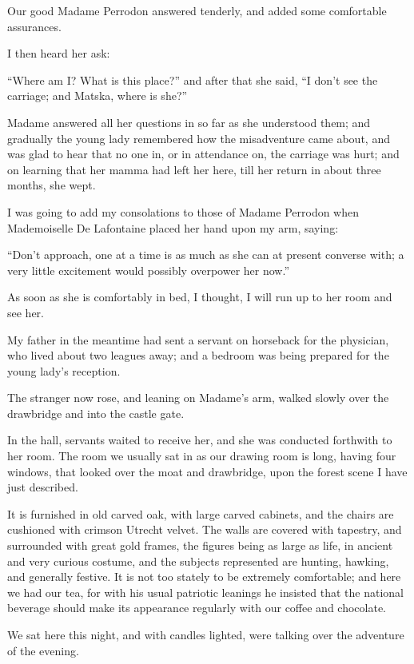 \documentclass[11pt,twoside,makeidx,hidelinks,]{memoir}
\begin{document}
Our good Madame Perrodon answered tenderly, and added some comfortable
assurances.

I then heard her ask:

``Where am I? What is this place?'' and after that she said, ``I don't see
the carriage; and Matska, where is she?''

Madame answered all her questions in so far as she understood them; and
gradually the young lady remembered how the misadventure came about, and
was glad to hear that no one in, or in attendance on, the carriage was
hurt; and on learning that her mamma had left her here, till her return
in about three months, she wept.

I was going to add my consolations to those of Madame Perrodon when
Mademoiselle De Lafontaine placed her hand upon my arm, saying:

``Don't approach, one at a time is as much as she can at present converse
with; a very little excitement would possibly overpower her now.''

As soon as she is comfortably in bed, I thought, I will run up to her
room and see her.

My father in the meantime had sent a servant on horseback for the
physician, who lived about two leagues away; and a bedroom was being
prepared for the young lady's reception.

The stranger now rose, and leaning on Madame's arm, walked slowly over
the drawbridge and into the castle gate.

In the hall, servants waited to receive her, and she was conducted
forthwith to her room. The room we usually sat in as our drawing room is
long, having four windows, that looked over the moat and drawbridge,
upon the forest scene I have just described.

It is furnished in old carved oak, with large carved cabinets, and the
chairs are cushioned with crimson Utrecht velvet. The walls are covered
with tapestry, and surrounded with great gold frames, the figures being
as large as life, in ancient and very curious costume, and the subjects
represented are hunting, hawking, and generally festive. It is not too
stately to be extremely comfortable; and here we had our tea, for with
his usual patriotic leanings he insisted that the national beverage
should make its appearance regularly with our coffee and chocolate.

We sat here this night, and with candles lighted, were talking over the
adventure of the evening.
\end{document}
